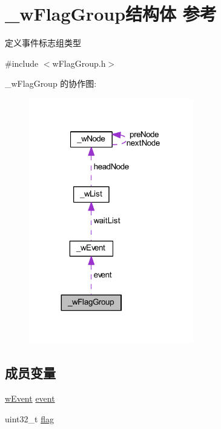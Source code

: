 \hypertarget{struct__w_flag_group}{}\section{\+\_\+w\+Flag\+Group结构体 参考}
\label{struct__w_flag_group}


定义事件标志组类型  




{\ttfamily \#include $<$w\+Flag\+Group.\+h$>$}



\+\_\+w\+Flag\+Group 的协作图\+:
\nopagebreak
\begin{figure}[H]
\begin{center}
\leavevmode
\includegraphics[width=203pt]{struct__w_flag_group__coll__graph}
\end{center}
\end{figure}
\subsection*{成员变量}
\begin{DoxyCompactItemize}
\item 
\mbox{\hyperlink{w_event_8h_af8b15988a26e1ac0d63eaf3fc5afe9d3}{w\+Event}} \mbox{\hyperlink{struct__w_flag_group_ad737d3f95a5cf9ee457f37f1cedfa44a}{event}}
\item 
uint32\+\_\+t \mbox{\hyperlink{struct__w_flag_group_a8fac2498fe5bd106b35d43af5bc91f6f}{flag}}
\end{DoxyCompactItemize}


